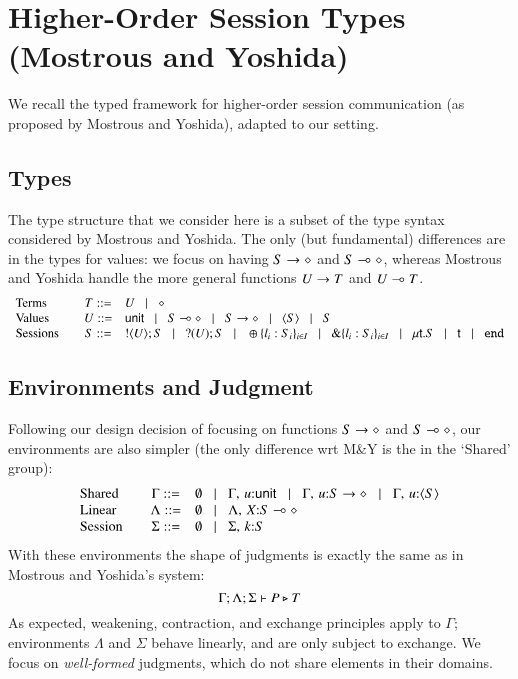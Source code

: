 
\newcommand{\Proc}{\ensuremath{\diamond}}
\newcommand{\Unit}{\ensuremath{\mathsf{unit}}}
\newcommand{\UnitV}{\ensuremath{()}}

\section{Higher-Order Session Types (Mostrous and Yoshida)}

We recall the typed framework for higher-order session communication (as proposed by Mostrous and Yoshida), adapted to our setting.

\subsection{Types}
The type structure that we consider here is a subset of the type syntax considered by Mostrous and Yoshida.
The only (but fundamental) differences are in the types for values: we focus on having 
$S \rightarrow \diamond$ and $S \multimap \diamond$, whereas Mostrous and Yoshida handle the more general functions $U \rightarrow T$ and 
$U \multimap T$.
\[
\begin{array}{lcl}
\text{Terms} & T ::= & U  \bnfbar  \Proc\\
\text{Values} & U ::= & \Unit  \bnfbar  \lhot{S} \bnfbar \shot{S} \bnfbar \chtype{S} \bnfbar S \\
\text{Sessions} \quad & S ::= &  \btout{U} S \bnfbar \btinp{U} S
		\bnfbar		\btsel{l_i:S_i}_{i \in I} \bnfbar \btbra{l_i:S_i}_{i \in I} \bnfbar \trec{t}{S} \bnfbar \vart{t}  \bnfbar \tinact 
\end{array}
\]

\subsection{Environments and Judgment}
Following our design decision of focusing on functions $S \rightarrow \diamond$ and $S \multimap \diamond$, our environments are also simpler (the only difference wrt M\&Y is the in the `Shared' group):
\[
\begin{array}{lcl}
\text{Shared} & \Gamma :: = & \emptyset \bnfbar \Gamma, \, u{:}\Unit \bnfbar \Gamma,\, u{:}\shot{S} \bnfbar \Gamma, \,u{:}\chtype{S} \\
\text{Linear} & \Lambda :: = & \emptyset \bnfbar \Lambda,\, X{:}\lhot{S}  \\
\text{Session} \quad & \Sigma :: = & \emptyset \bnfbar \Sigma,\, k{:}S  
\end{array}
\]
With these environments the shape of judgments is exactly the same as in Mostrous and Yoshida's system:
\[
\Gamma; \Lambda ; \Sigma \vdash P \triangleright T
\]
As expected, weakening, contraction, and exchange principles apply to $\Gamma$; environments $\Lambda$ and $\Sigma$ behave linearly, and are only subject to exchange.
We focus on \emph{well-formed} judgments, which do not share elements in their domains.


